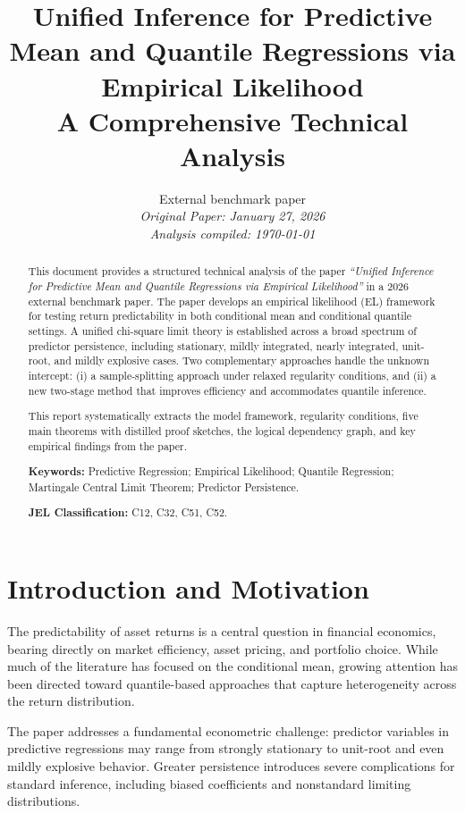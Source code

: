 \documentclass[11pt,a4paper]{article}
\title{\textbf{Unified Inference for Predictive Mean and Quantile Regressions via Empirical Likelihood}\\[4pt]
\large A Comprehensive Technical Analysis}
\author{%
    External benchmark paper\\[4pt]
    \small\textit{Original Paper: January 27, 2026}\\[2pt]
    \small\textit{Analysis compiled: \today}
}
\date{}
\theoremstyle{definition}
\theoremstyle{remark}
\begin{document}
\maketitle

\begin{abstract}
\noindent This document provides a structured technical analysis of the paper
\textit{``Unified Inference for Predictive Mean and Quantile Regressions via Empirical Likelihood''}
in a 2026 external benchmark paper.
The paper develops an empirical likelihood (EL) framework for testing return predictability
in both conditional mean and conditional quantile settings.
A unified chi-square limit theory is established across a broad spectrum of predictor persistence,
including stationary, mildly integrated, nearly integrated, unit-root, and mildly explosive cases.
Two complementary approaches handle the unknown intercept:
(i) a sample-splitting approach under relaxed regularity conditions, and
(ii) a new two-stage method that improves efficiency and accommodates quantile inference.

This report systematically extracts the model framework, regularity conditions,
five main theorems with distilled proof sketches, the logical dependency graph,
and key empirical findings from the paper.

\bigskip
\noindent\textbf{Keywords:} Predictive Regression; Empirical Likelihood; Quantile Regression;
Martingale Central Limit Theorem; Predictor Persistence.

\noindent\textbf{JEL Classification:} C12, C32, C51, C52.
\end{abstract}

\newpage
\tableofcontents
\newpage

\section{Introduction and Motivation}

The predictability of asset returns is a central question in financial economics,
bearing directly on market efficiency, asset pricing, and portfolio choice.
While much of the literature has focused on the conditional mean,
growing attention has been directed toward quantile-based approaches
that capture heterogeneity across the return distribution.

The paper addresses a fundamental econometric challenge:
predictor variables in predictive regressions may range from strongly stationary
to unit-root and even mildly explosive behavior.
Greater persistence introduces severe complications for standard inference,
including biased coefficients and nonstandard limiting distributions.
\end{document}
